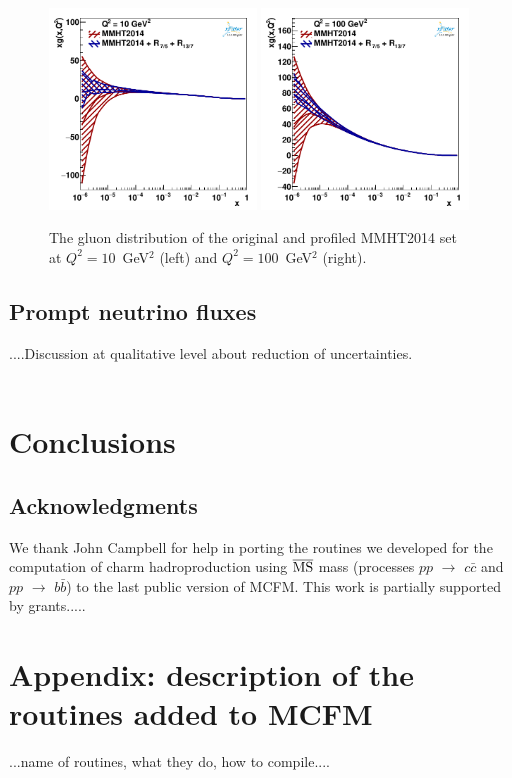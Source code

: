 \documentclass[12pt,a4paper]{article}
\begin{document}
\begin{figure}
    \centering
    \includegraphics[width=0.49\textwidth]{figs/q2_10_pdf_g.pdf}
    \includegraphics[width=0.49\textwidth]{figs/q2_100_pdf_g.pdf}
    \caption{The gluon distribution of the original and profiled MMHT2014 set at $Q^2 = 10$~GeV$^2$ (left) and $Q^2 = 100$~GeV$^2$ (right).}
    \label{fig:extrap-profile}
\end{figure}

\subsection{Prompt neutrino fluxes}

....Discussion at qualitative level about reduction of uncertainties.
\\
\\

\section{Conclusions}
\label{conclu}


\subsection*{Acknowledgments}
We thank John Campbell for help in porting the routines we developed for
the computation of charm hadroproduction using $\overline{\rm MS}$ mass 
(processes $pp$ $\rightarrow$ $c\bar{c}$ and $pp$ $\rightarrow$ $b\bar{b}$) 
to the last public version of MCFM. 
This work is partially supported by grants.....

\section*{Appendix: description of the routines added to MCFM}
...name of routines, what they do, how to compile.... 

\cleardoublepage
\newpage

 

\end{document}
